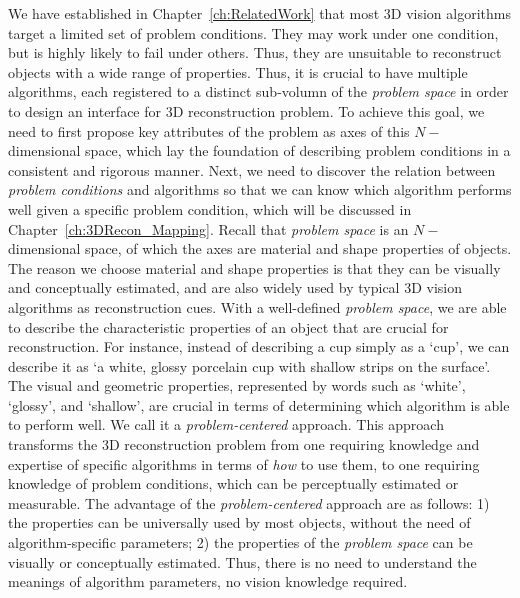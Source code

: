 We have established in Chapter~\ref{ch:RelatedWork} that most 3D vision algorithms target a limited set of problem conditions. They may work under one condition, but is highly likely to fail under others. Thus, they are unsuitable to reconstruct objects with a wide range of properties. Thus, it is crucial to have multiple algorithms, each registered to a distinct sub-volumn of the \textit{problem space} in order to design an interface for 3D reconstruction problem. To achieve this goal, we need to first propose key attributes of the problem as axes of this $N-$dimensional space, which lay the foundation of describing problem conditions in a consistent and rigorous manner. Next, we need to discover the relation between \textit{problem conditions} and algorithms so that we can know which algorithm performs well given a specific problem condition, which will be discussed in Chapter~\ref{ch:3DRecon_Mapping}. Recall that \textit{problem space} is an $N-$dimensional space, of which the axes are material and shape properties of objects. The reason we choose material and shape properties is that they can be visually and conceptually estimated, and are also widely used by typical 3D vision algorithms as reconstruction cues. With a well-defined \textit{problem space}, we are able to describe the characteristic properties of an object that are crucial for reconstruction. For instance, instead of describing a cup simply as a `cup', we can describe it as `a white, glossy porcelain cup with shallow strips on the surface'. The visual and geometric properties, represented by words such as `white', `glossy', and `shallow', are crucial in terms of determining which algorithm is able to perform well. We call it a \textit{problem-centered} approach. This approach transforms the 3D reconstruction problem from one requiring knowledge and expertise of specific algorithms in terms of \textit{how} to use them, to one requiring knowledge of problem conditions, which can be perceptually estimated or measurable. The advantage of the \textit{problem-centered} approach are as follows: 1) the properties can be universally used by most objects, without the need of algorithm-specific parameters; 2) the properties of the \textit{problem space} can be visually or conceptually estimated. Thus, there is no need to understand the meanings of algorithm parameters, \ie no vision knowledge required.


